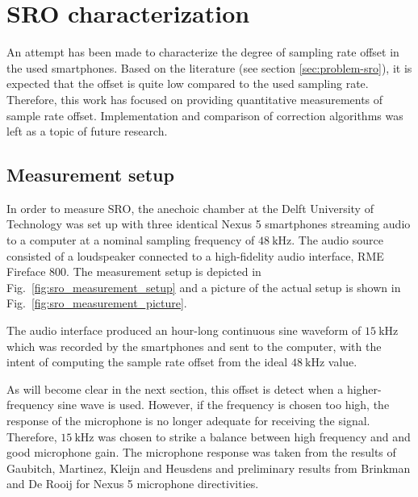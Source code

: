 \documentclass[a4paper, notitlepage]{report}
\begin{document}
\section{SRO characterization}
\label{sec:sro-characterization}
An attempt has been made to characterize the degree of sampling rate offset in the used smartphones. Based on the literature (see section \ref{sec:problem-sro}), it is expected that the offset is quite low compared to the used sampling rate. Therefore, this work has focused on providing quantitative measurements of sample rate offset. Implementation and comparison of correction algorithms was left as a topic of future research. 

\subsection{Measurement setup}
In order to measure SRO, the anechoic chamber at the Delft University of Technology was set up with three identical Nexus 5 smartphones streaming audio to a computer at a nominal sampling frequency of $48~\mathrm{kHz}$. The audio source consisted of a loudspeaker connected to a high-fidelity audio interface, RME Fireface 800. The measurement setup is depicted in Fig.~\ref{fig:sro_measurement_setup} and a picture of the actual setup is shown in Fig.~\ref{fig:sro_measurement_picture}.

The audio interface produced an hour-long continuous sine waveform of $15~\mathrm{kHz}$ which was recorded by the smartphones and sent to the computer, with the intent of computing the sample rate offset from the ideal $48~\mathrm{kHz}$ value.

As will become clear in the next section, this offset is detect when a higher-frequency sine wave is used. However, if the frequency is chosen too high, the response of the microphone is no longer adequate for receiving the signal. Therefore, $15~\mathrm{kHz}$ was chosen to strike a balance between high frequency and and good microphone gain. The microphone response was taken from the results of Gaubitch, Martinez, Kleijn and Heusdens \cite{Gaubitch2014} and preliminary results from Brinkman and De Rooij \cite{BAP:RosalieTim} for Nexus 5 microphone directivities.
\end{document}
